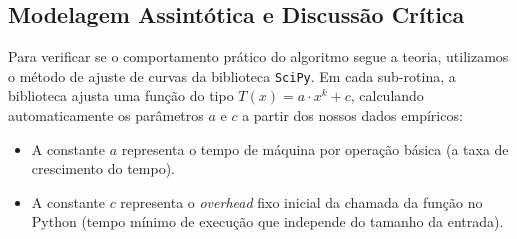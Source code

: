 \documentclass[12pt]{article}
\begin{document}
\begin{table}[H]
\centering
\caption{Resultados empíricos do Algoritmo de Christofides (TSPLIB).}
\label{tab:christofides_resumo}
\end{table}

\subsection{Modelagem Assintótica e Discussão Crítica}

Para verificar se o comportamento prático do algoritmo segue a teoria, utilizamos o método de ajuste de curvas da biblioteca \texttt{SciPy}. Em cada sub-rotina, a biblioteca ajusta uma função do tipo $T(x) = a \cdot x^k + c$, calculando automaticamente os parâmetros $a$ e $c$ a partir dos nossos dados empíricos:
\begin{itemize}
    \item A constante $a$ representa o tempo de máquina por operação básica (a taxa de crescimento do tempo).
    \item A constante $c$ representa o \textit{overhead} fixo inicial da chamada da função no Python (tempo mínimo de execução que independe do tamanho da entrada).
\end{itemize}
\end{document}

